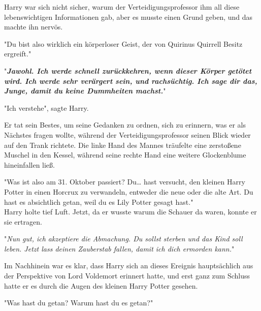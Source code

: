 {Harry war sich nicht sicher, warum der Verteidigungsprofessor ihm all diese lebenswichtigen Informationen gab, aber es musste einen Grund geben, und das machte ihn nervös.

"Du bist also wirklich ein körperloser Geist, der von Quirinus Quirrell Besitz ergreift."

"\textbf{\emph{Jawohl. Ich werde schnell zurückkehren, wenn dieser Körper getötet wird. Ich werde sehr verärgert sein, und rachsüchtig. Ich sage dir das, Junge, damit du keine Dummheiten machst.}}"

"Ich verstehe", sagte Harry.

Er tat sein Bestes, um seine Gedanken zu ordnen, sich zu erinnern, was er als Nächstes fragen wollte, während der Verteidigungsprofessor seinen Blick wieder auf den Trank richtete. Die linke Hand des Mannes träufelte eine zerstoßene Muschel in den Kessel, während seine rechte Hand eine weitere Glockenblume hineinfallen ließ.

"Was ist also am 31. Oktober passiert? Du… hast versucht, den kleinen Harry Potter in einen Horcrux zu verwandeln, entweder die neue oder die alte Art. Du hast es absichtlich getan, weil du es Lily Potter gesagt hast."\\ Harry holte tief Luft. Jetzt, da er wusste warum die Schauer da waren, konnte er sie ertragen.

"\emph{Nun gut, ich akzeptiere die Abmachung. Du sollst sterben und das Kind soll leben. Jetzt lass deinen Zauberstab fallen, damit ich dich ermorden kann.}"

Im Nachhinein war es klar, dass Harry sich an dieses Ereignis hauptsächlich aus der Perspektive von Lord Voldemort erinnert hatte, und erst ganz zum Schluss hatte er es durch die Augen des kleinen Harry Potter gesehen.

"Was hast du getan? Warum hast du es getan?"

}

